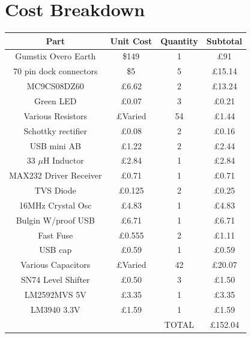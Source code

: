 \documentclass[11pt]{report} %
\begin{document}
\chapter{Cost Breakdown}
	\begin{tabular}{|c|c|c|c|}
	\hline
	Part & Unit Cost & Quantity & Subtotal\\
	\hline
	Gumstix Overo Earth & \$149 & 1 & £91\\
	
	70 pin dock connectors & \$5 & 5 & £15.14\\

	MC9CS08DZ60 & £6.62 & 2 & £13.24\\

	Green LED & £0.07 & 3 & £0.21\\

	Various Resistors & £Varied & 54 & £1.44\\

	Schottky rectifier & £0.08 & 2 & £0.16\\

	USB mini AB & £1.22 & 2 & £2.44\\

	33 $\mu$H Inductor & £2.84 & 1 & £2.84\\

	MAX232 Driver Receiver & £0.71 & 1 & £0.71\\

	TVS Diode & £0.125 & 2 & £0.25\\

	16MHz Crystal Osc & £4.83 & 1 & £4.83\\

	Bulgin W/proof USB & £6.71 & 1 & £6.71\\

	Fast Fuse & £0.555 & 2 & £1.11\\

	USB cap & £0.59 & 1 & £0.59\\

	Various Capacitors & £Varied & 42 & £20.07\\

	SN74 Level Shifter & £0.50 & 3 & £1.50\\

	LM2592MVS 5V & £3.35 & 1 & £3.35\\

	LM3940 3.3V & £1.59 & 1 & £1.59\\
	\hline
	& & TOTAL & £152.04\\
	\hline
	\end{tabular}
	
\end{document}
